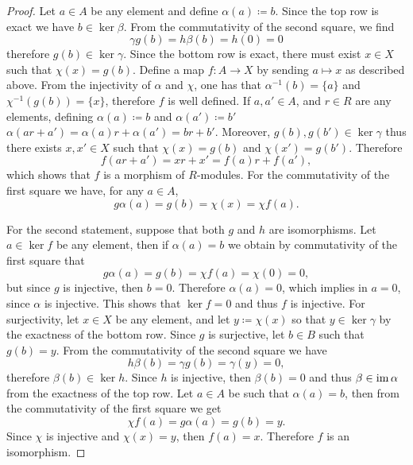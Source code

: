 \begin{proof}
    Let \(a \in A\) be any element and define \(\alpha(a) \coloneq b\). Since the
    top row is exact we have \(b \in \ker \beta\). From the commutativity of the
    second square, we find
    \[
        \gamma g(b) = h \beta(b) = h(0) = 0
    \]
    therefore \(g(b) \in \ker \gamma\). Since the bottom row is exact, there must
    exist \(x \in X\) such that \(\chi(x) = g(b)\). Define a map \(f: A \to X\) by
    sending \(a \mapsto x\) as described above. From the injectivity of \(\alpha\)
    and \(\chi\), one has that \(\alpha^{-1}(b) = \{a\}\) and
    \(\chi^{-1}(g(b)) = \{x\}\), therefore \(f\) is well defined. If
    \(a, a' \in A\), and \(r \in R\) are any elements, defining
    \(\alpha(a) \coloneq b\) and \(\alpha(a') \coloneq b'\)
    \(\alpha(a r + a') = \alpha(a) r + \alpha(a') = b r + b'\). Moreover,
    \(g(b), g(b') \in \ker \gamma\) thus there exists \(x, x' \in X\) such that
    \(\chi(x) = g(b)\) and \(\chi(x') = g(b')\). Therefore
    \[
        f(a r + a') = x r + x' = f(a) r + f(a'),
    \]
    which shows that \(f\) is a morphism of \(R\)-modules. For the commutativity of
    the first square we have, for any \(a \in A\),
    \[
        g \alpha(a) = g(b) = \chi(x) = \chi f(a).
    \]

    For the second statement, suppose that both \(g\) and \(h\) are
    isomorphisms. Let \(a \in \ker f\) be any element, then if \(\alpha(a) = b\) we
    obtain by commutativity of the first square that
    \[
        g \alpha(a) = g(b) = \chi f(a) = \chi(0) = 0,
    \]
    but since \(g\) is injective, then \(b = 0\). Therefore \(\alpha(a) = 0\), which
    implies in \(a = 0\), since \(\alpha\) is injective. This shows that \(\ker f =
    0\) and thus \(f\) is injective. For surjectivity, let \(x \in X\) be any
    element, and let \(y \coloneq \chi(x)\) so that \(y \in \ker \gamma\) by the
    exactness of the bottom row. Since \(g\) is surjective, let \(b \in B\) such
    that \(g(b) = y\). From the commutativity of the second square we have
    \[
        h \beta(b) = \gamma g(b) = \gamma(y) = 0,
    \]
    therefore \(\beta(b) \in \ker h\). Since \(h\) is injective, then
    \(\beta(b) = 0\) and thus \(\beta \in \operatorname{im} \alpha\) from the exactness of the top
    row. Let \(a \in A\) be such that \(\alpha(a) = b\), then from the commutativity
    of the first square we get
    \[
        \chi f(a) = g \alpha(a) = g(b) = y.
    \]
    Since \(\chi\) is injective and \(\chi(x) = y\), then \(f(a) = x\). Therefore
    \(f\) is an isomorphism.
\end{proof}

